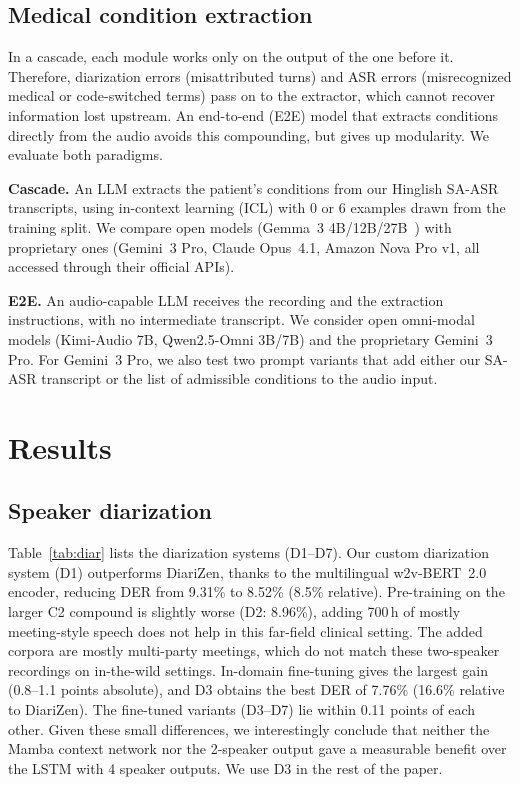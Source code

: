 \documentclass{article}
\begin{document}
\subsection{Medical condition extraction}
\label{ssec:extraction}

In a cascade, each module works only on the output of the one before it. Therefore, diarization errors (misattributed turns) and ASR errors (misrecognized medical or code-switched terms) pass on to the extractor, which cannot recover information lost upstream.
An end-to-end (E2E) model that extracts conditions directly from the audio avoids this compounding, but gives up modularity.
We evaluate both paradigms.

\vspace{1mm}

\noindent\textbf{Cascade.} An LLM extracts the patient's conditions from our Hinglish SA-ASR transcripts, using in-context learning (ICL) with 0 or 6 examples drawn from the training split.
We compare open models (Gemma~3 4B/12B/27B~\cite{gemma_2025}) with proprietary ones (Gemini~3 Pro, Claude Opus~4.1, Amazon Nova Pro v1, all accessed through their official APIs).

\vspace{1mm}

\noindent\textbf{E2E.} An audio-capable LLM receives the recording and the extraction instructions, with no intermediate transcript.
We consider open omni-modal models (Kimi-Audio 7B, Qwen2.5-Omni 3B/7B) and the proprietary Gemini~3 Pro.
For Gemini~3 Pro, we also test two prompt variants that add either our SA-ASR transcript or the list of admissible conditions to the audio input.



\section{Results}
\label{sec:results}

\subsection{Speaker diarization}
\label{ssec:res-diar}


Table~\ref{tab:diar} lists the diarization systems (D1--D7).
Our custom diarization system (D1) outperforms DiariZen, thanks to the multilingual w2v-BERT~2.0 encoder, reducing DER from 9.31\% to 8.52\% (8.5\% relative).
Pre-training on the larger C2 compound is slightly worse (D2: 8.96\%), adding 700\,h of mostly meeting-style speech does not help in this far-field clinical setting. The added corpora are mostly multi-party meetings, which do not match these two-speaker recordings on in-the-wild settings.
In-domain fine-tuning gives the largest gain (0.8--1.1 points absolute), and D3 obtains the best DER of 7.76\% (16.6\% relative to DiariZen).
The fine-tuned variants (D3--D7) lie within 0.11 points of each other. Given these small differences, we interestingly conclude that neither the Mamba context network nor the 2-speaker output gave a measurable benefit over the LSTM with 4 speaker outputs.
We use D3 in the rest of the paper.
\end{document}
